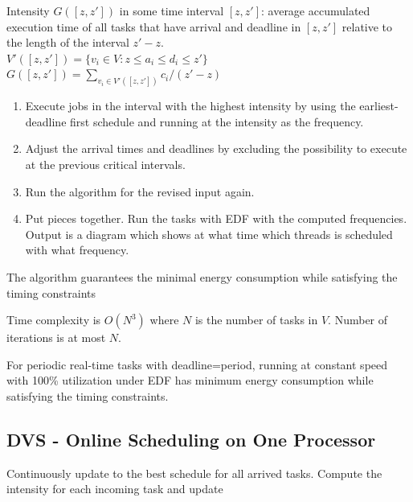 \begin{definition}[Intensity]
Intensity $G([z, z'])$ in some time interval $[z, z']$: average accumulated execution time of all tasks that have arrival and deadline in $[z, z']$ relative to the length of the interval $z'-z$.\\
$V'([z, z']) = \{ v_i \in V: z \leq a_i \le d_i \leq z' \} $\\
$ G([z, z'])  = \sum\limits_{v_i \in V'([z, z'])} c_i/(z'-z)$
\end{definition}


\begin{enumerate}
\item Execute jobs in the interval with the highest intensity by using the earliest-deadline first schedule and running at the intensity as the frequency.
\item Adjust the arrival times and deadlines by excluding the
possibility to execute at the previous critical intervals.
\item Run the algorithm for the revised input again.
\item Put pieces together. Run the tasks with EDF with the computed frequencies. Output is a diagram which shows at what time which threads is scheduled with what frequency.
\end{enumerate}

\begin{theorem}
The algorithm guarantees the minimal energy consumption while satisfying the timing constraints
\end{theorem}

\begin{theorem}
Time complexity is $O(N^3)$ where $N$ is the number of tasks in $V$. Number of iterations is at most $N$.
\end{theorem}

\begin{theorem}
For periodic real-time tasks with deadline=period, running at constant speed with 100\% utilization under EDF has minimum energy consumption while satisfying the timing constraints.
\end{theorem}

\subsection{DVS - Online Scheduling on One Processor}
Continuously update to the best schedule for all arrived tasks. Compute the intensity for each incoming task and update

